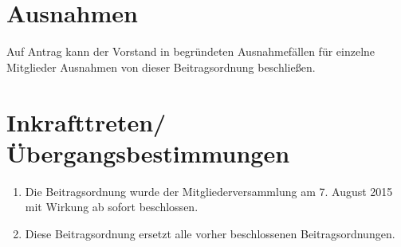 \documentclass[a4paper, 12pt]{scrartcl}
\begin{document}
\section{Ausnahmen}
Auf Antrag kann der Vorstand in begründeten Ausnahmefällen für einzelne Mitglieder Ausnahmen von dieser Beitragsordnung beschließen.

\section{Inkrafttreten/Übergangsbestimmungen}
\begin{enumerate}
  \item Die Beitragsordnung wurde der Mitgliederversammlung am 7. August 2015 mit Wirkung ab sofort beschlossen.
  \item Diese Beitragsordnung ersetzt alle vorher beschlossenen Beitragsordnungen.
\end{enumerate}
\end{document}
